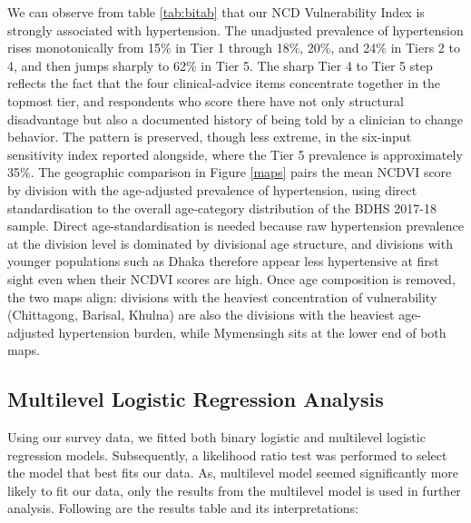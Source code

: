 \documentclass[
  12pt,
  a4paper]{article}
\begin{document}
We can observe from table \ref{tab:bitab} that our NCD Vulnerability Index is strongly associated with hypertension. The unadjusted prevalence of hypertension rises monotonically from 15\% in Tier 1 through 18\%, 20\%, and 24\% in Tiers 2 to 4, and then jumps sharply to 62\% in Tier 5. The sharp Tier 4 to Tier 5 step reflects the fact that the four clinical-advice items concentrate together in the topmost tier, and respondents who score there have not only structural disadvantage but also a documented history of being told by a clinician to change behavior. The pattern is preserved, though less extreme, in the six-input sensitivity index reported alongside, where the Tier 5 prevalence is approximately 35\%. The geographic comparison in Figure \ref{maps} pairs the mean NCDVI score by division with the age-adjusted prevalence of hypertension, using direct standardisation to the overall age-category distribution of the BDHS 2017-18 sample. Direct age-standardisation is needed because raw hypertension prevalence at the division level is dominated by divisional age structure, and divisions with younger populations such as Dhaka therefore appear less hypertensive at first sight even when their NCDVI scores are high. Once age composition is removed, the two maps align: divisions with the heaviest concentration of vulnerability (Chittagong, Barisal, Khulna) are also the divisions with the heaviest age-adjusted hypertension burden, while Mymensingh sits at the lower end of both maps.


\subsection{Multilevel Logistic Regression Analysis}\label{multilevel-logistic-regression-analysis}

Using our survey data, we fitted both binary logistic and multilevel logistic regression models. Subsequently, a likelihood ratio test was performed to select the model that best fits our data. As, multilevel model seemed significantly more likely to fit our data, only the results from the multilevel model is used in further analysis. Following are the results table and its interpretations:
\end{document}
